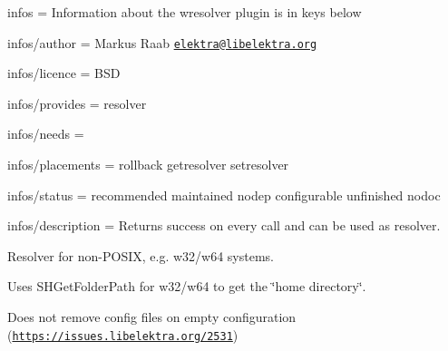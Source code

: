 
\begin{DoxyItemize}
\item infos = Information about the wresolver plugin is in keys below
\item infos/author = Markus Raab \href{mailto:elektra@libelektra.org}{\tt elektra@libelektra.\+org}
\item infos/licence = B\+SD
\item infos/provides = resolver
\item infos/needs =
\item infos/placements = rollback getresolver setresolver
\item infos/status = recommended maintained nodep configurable unfinished nodoc
\item infos/description = Returns success on every call and can be used as resolver.
\end{DoxyItemize}

Resolver for non-\/\+P\+O\+S\+IX, e.\+g. w32/w64 systems.

Uses S\+H\+Get\+Folder\+Path for w32/w64 to get the \char`\"{}home directory\char`\"{}.


\begin{DoxyItemize}
\item Does not remove config files on empty configuration (\href{https://issues.libelektra.org/2531}{\tt https\+://issues.\+libelektra.\+org/2531}) 
\end{DoxyItemize}